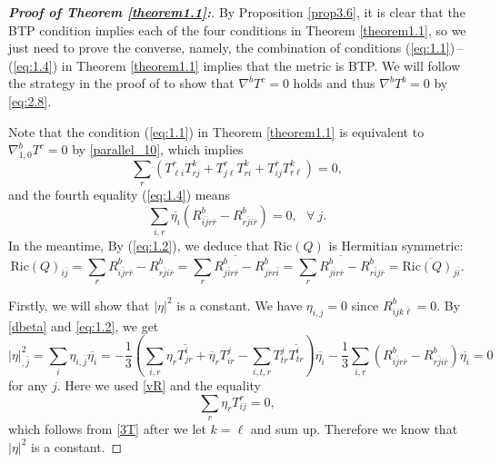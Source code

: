 \documentclass{amsart}
\numberwithin{equation}{section}
\theoremstyle{definition}
\renewcommand{\1}{\mathds{1}}
\renewcommand{\>}{\rightarrow}
\begin{document}
\begin{proof}[{\bf Proof of Theorem \ref{theorem1.1}:}]
By Proposition \ref{prop3.6}, it is clear that the BTP condition implies each of the four conditions in Theorem \ref{theorem1.1},
so we just need to prove the converse, namely, the combination of conditions (\ref{eq:1.1})\,--\,(\ref{eq:1.4}) in Theorem \ref{theorem1.1} implies that the metric is BTP.
We will follow the strategy in the proof of \cite[Proposition 2]{ZhaoZ19Str} to show that $\nabla^bT^c=0$ holds and thus $\nabla^bT^b=0$  by \eqref{eq:2.8}.

Note that the condition (\ref{eq:1.1}) in Theorem \ref{theorem1.1} is equivalent to $\nabla^b_{1,0}T^c=0$ by \eqref{parallel_10}, which implies \begin{equation}\label{3T}
\sum_r(T^r_{\ell i}T^k_{r j} + T^r_{j\ell}T^k_{ri} + T^r_{ij}T^k_{r \ell})=0,
\end{equation}
and the fourth equality (\ref{eq:1.4}) means
\begin{equation}\label{vR}
\sum_{i,r} \overline{\eta_i} ( R^b_{i\bar{j}r\bar{r}} - R^b_{r \bar{j} i \bar{r}}) =0,   \ \ \  \forall \ j.
\end{equation}
In the meantime, By (\ref{eq:1.2}), we deduce that $\mathrm{Ric}(Q)$ is Hermitian symmetric:
\[\mathrm{Ric}(Q)_{i \bar{j}}= \sum_r R^b_{i \bar{j} r \bar{r}} - R^b_{r \bar{j} i \bar{r}}
= \overline{\sum_r R^b_{j \bar{i} r \bar{r}} - R^b_{j \bar{r} r \bar{i}}}
= \overline{\sum_r R^b_{j \bar{i} r \bar{r}} - R^b_{r \bar{i} j \bar{r}}}
=\overline{\mathrm{Ric}(Q)_{j \bar{i}}}.\]

Firstly, we will show that $|\eta|^2$ is a constant. We have $\eta_{i,j}=0$ since $R^b_{ijk\overline{\ell}}=0$.
By \eqref{dbeta} and \eqref{eq:1.2}, we get
\[|\eta|^2_{,\bar{j}}= \sum_i \eta_{i,\bar{j}}\overline{\eta_i}
=-\frac{1}{3}(\sum_{i,r}\eta_r \overline{T^i_{jr}} + \overline{\eta}_r T^j_{ir} - \sum_{i,t,r}T^j_{tr}\overline{T^i_{tr}})\overline{\eta_i} - \frac{1}{3}\sum_{i,r}(R^b_{i\bar{j}r\bar{r}} - R^b_{r\bar{j}i\bar{r}})\overline{\eta_i}=0\]
for any $j$. Here we used \eqref{vR} and the equality
\begin{equation}\label{eta_T}
\sum_r \eta_r T_{ij}^r =0,
\end{equation}
which follows from \eqref{3T} after we let $k=\ell$ and sum up. Therefore we know that $|\eta|^2$ is a constant.


\end{proof}
\end{document}
